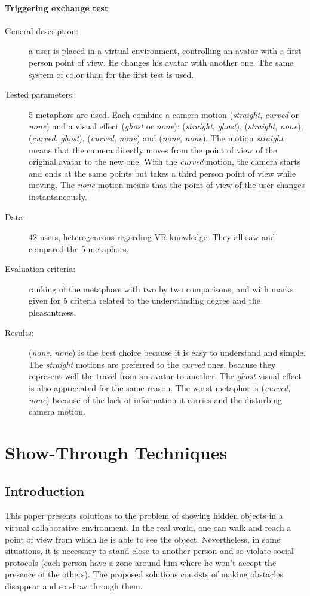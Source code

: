 \documentclass[a4paper]{article}
\begin{document}
\paragraph{Triggering exchange test}
\begin{description}
	\item[General description:] a user is placed in a virtual environment, controlling an avatar with a first person point of view. He changes his avatar with another one. The same system of color than for the first test is used.
	\item[Tested parameters:] 5 metaphors are used. Each combine a camera motion (\textit{straight}, \textit{curved} or \textit{none}) and a visual effect (\textit{ghost} or \textit{none}): (\textit{straight}, \textit{ghost}), (\textit{straight}, \textit{none}), (\textit{curved}, \textit{ghost}), (\textit{curved}, \textit{none}) and (\textit{none}, \textit{none}). The motion \textit{straight} means that the camera directly moves from the point of view of the original avatar to the new one. With the \textit{curved} motion, the camera starts and ends at the same points but takes a third person point of view while moving. The \textit{none} motion means that the point of view of the user changes instantaneously.
	\item[Data:] 42 users, heterogeneous regarding VR knowledge. They all saw and compared   the 5 metaphors.
	\item[Evaluation criteria:] ranking of the metaphors with two by two comparisons, and with marks given for 5 criteria related to the understanding degree and the pleasantness.
	\item[Results:] (\textit{none}, \textit{none}) is the best choice because it is easy to understand and simple. The \textit{straight} motions are preferred to the \textit{curved} ones, because they represent well the travel from an avatar to another. The \textit{ghost} visual effect is also appreciated for the same reason. The worst metaphor is (\textit{curved}, \textit{none}) because of the lack of information it carries and the disturbing camera motion.
\end{description}

\section{Show-Through Techniques}

\subsection{Introduction}
This paper presents solutions to the problem of showing hidden objects in a virtual collaborative environment. In the real world, one can walk and reach a point of view from which he is able to see the object. Nevertheless, in some situations, it is necessary to stand close to another person and so violate social protocols (each person have a zone around him where he won't accept the presence of the others). The proposed solutions consists of making obstacles disappear and so show through them.
\end{document}
